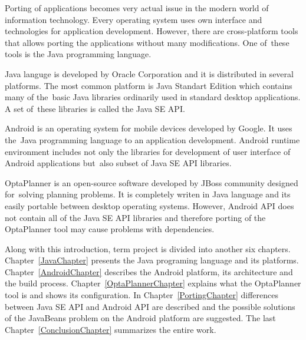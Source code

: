 Porting of applications becomes very actual issue in the modern world of information technology. Every operating system uses own interface and technologies for application development. However, there are cross-platform tools that allows porting the applications without many modifications. One of~these tools is the Java programming language.

Java languge is developed by Oracle Corporation and it is distributed in several platforms. The most common platform is Java Standart Edition which contains many of the~basic Java libraries ordinarily used in standard desktop applications. A set of~these libraries is called the Java SE API.

Android is an operating system for mobile devices developed by Google. It uses the~Java programming language to an application development. Android runtime environment includes not only the libraries for development of user interface of Android applications but~also subset of Java SE API libraries.

OptaPlanner is an open-source software developed by JBoss community designed for~solving planning problems. It is completely writen in Java language and its easily portable between desktop operating systems. However, Android API does not contain all of the Java SE API libraries and therefore porting of the OptaPlanner tool may cause problems with dependencies.

Along with this introduction, term project is divided into another six chapters. Chapter~\ref{JavaChapter} presents the Java programing language and its platforms. Chapter~\ref{AndroidChapter} describes the Android platform, its architecture and the build process. Chapter~\ref{OptaPlannerChapter} explains what the OptaPlanner tool is and shows its configuration. In Chapter~\ref{PortingChapter} differences between Java SE API and Android API are described and the possible solutions of the JavaBeans problem on the Android platform are suggested. The last Chapter~\ref{ConclusionChapter} summarizes the entire work.

